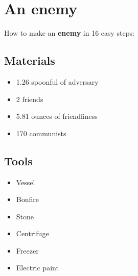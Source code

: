 \documentclass{article}
\begin{document}
\section{An enemy}How to make an \textbf{enemy} in 16 easy steps:

\subsection{Materials}\begin{itemize}
\item 
1.26 spoonful of adversary
\item 
2 friends
\item 
5.81 ounces of friendliness
\item 
170 communists
\end{itemize}
\subsection{Tools}\begin{itemize}
\item 
Vessel
\item 
Bonfire
\item 
Stone
\item 
Centrifuge
\item 
Freezer
\item 
Electric paint
\end{itemize}
\end{document}
